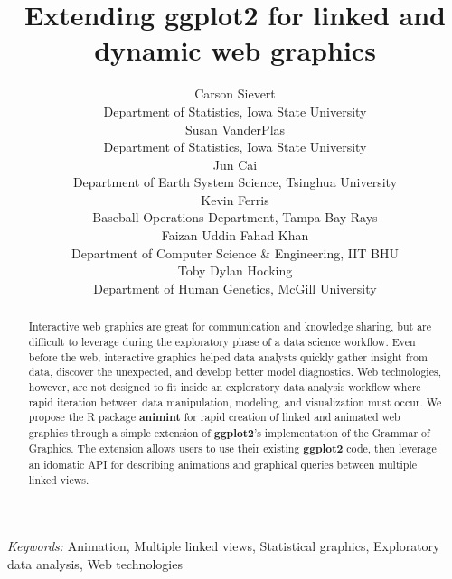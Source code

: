 \documentclass[12pt,]{article}
\theoremstyle{definition}
\theoremstyle{definition}
\theoremstyle{definition}
\theoremstyle{remark}
\begin{document}
\def\spacingset#1{\renewcommand{\baselinestretch}%
{#1}\small\normalsize} \spacingset{1}

\title{\bf Extending ggplot2 for linked and dynamic web graphics}
\author{
  Carson Sievert \\ 
  Department of Statistics, Iowa State University \\
  Susan VanderPlas \\
  Department of Statistics, Iowa State University \\
  Jun Cai \\
  Department of Earth System Science, Tsinghua University\\
  Kevin Ferris \\
  Baseball Operations Department, Tampa Bay Rays \\
  Faizan Uddin Fahad Khan \\
  Department of Computer Science \& Engineering, IIT BHU \\
  Toby Dylan Hocking \\ 
  Department of Human Genetics, McGill University \\
}
\maketitle

\bigskip
\begin{abstract}
Interactive web graphics are great for communication and knowledge
sharing, but are difficult to leverage during the exploratory phase of a
data science workflow. Even before the web, interactive graphics helped
data analysts quickly gather insight from data, discover the unexpected,
and develop better model diagnostics. Web technologies, however, are not
designed to fit inside an exploratory data analysis workflow where rapid
iteration between data manipulation, modeling, and visualization must
occur. We propose the R package \textbf{animint} for rapid creation of
linked and animated web graphics through a simple extension of
\textbf{ggplot2}'s implementation of the Grammar of Graphics. The
extension allows users to use their existing \textbf{ggplot2} code, then
leverage an idomatic API for describing animations and graphical queries
between multiple linked views.
\end{abstract}

\noindent
{\it Keywords:}  Animation, Multiple linked views, Statistical graphics, Exploratory data
analysis, Web technologies
\vfill

\newpage
\spacingset{1.45} %
\end{document}
